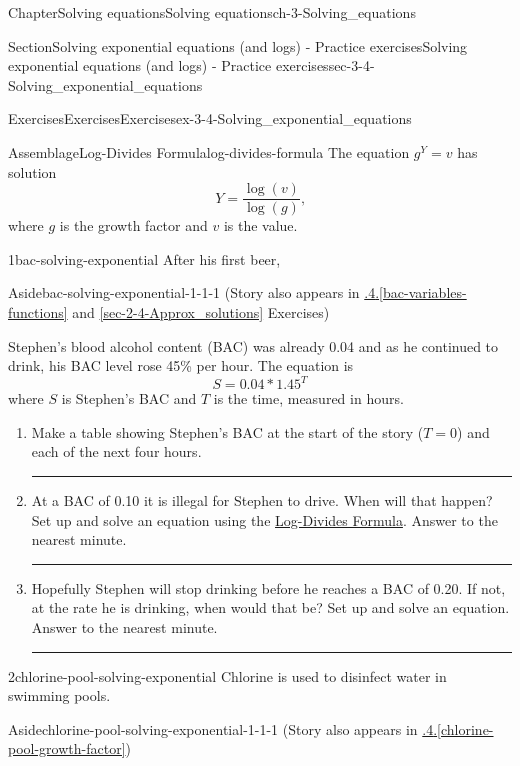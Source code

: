 \documentclass[twoside,11pt,]{book}
\newcommand{\xreffont}{\relax}
\newlength{\workspacestrutwidth}
\numberwithin{equation}{section}
\begin{document}
\begin{chapterptx}{Chapter}{Solving equations}{}{Solving equations}{}{}{ch-3-Solving_equations}
\begin{sectionptx}{Section}{Solving exponential equations (and logs) - Practice exercises}{}{Solving exponential equations (and logs) - Practice exercises}{}{}{sec-3-4-Solving_exponential_equations}
\begin{exercises-subsection-numberless}{Exercises}{Exercises}{}{Exercises}{}{}{ex-3-4-Solving_exponential_equations}
\begin{assemblage}{Assemblage}{Log-Divides Formula}{log-divides-formula}
The equation \(g^Y = v\) has solution%
\begin{equation*}
Y = \frac{\log (v)}{\log(g)}\text{,}
\end{equation*}
where \(g\) is the growth factor and \(v\) is the value.%
\end{assemblage}
\clearpage
\begin{divisionexercise}{1}{}{}{bac-solving-exponential}%
After his first beer, \begin{aside}{Aside}{}{bac-solving-exponential-1-1-1}%
(Story also appears in \hyperref[bac-variables-functions]{{\xreffont 1.1.4}.{\xreffont\ref{bac-variables-functions}}} and \hyperref[sec-2-4-Approx_solutions]{{\xreffont\ref{sec-2-4-Approx_solutions}}} Exercises)%
\end{aside}
 Stephen's blood alcohol content (BAC) was already 0.04 and as he continued to drink, his BAC level rose 45\% per hour. The equation is%
\begin{equation*}
S = 0.04 \ast 1.45^T
\end{equation*}
where \(S\) is Stephen's BAC and \(T\) is the time, measured in hours.%
\begin{enumerate}[label=(\alph*),ref=\alph*]%
\item{}Make a table showing Stephen's BAC at the start of the story (\(T=0\)) and each of the next four hours.%
\par\rule{\workspacestrutwidth}{1.5in}%
\item{}At a BAC of 0.10 it is illegal for Stephen to drive. When will that happen? Set up and solve an equation using the \hyperref[log-divides-formula]{Log-Divides Formula}. Answer to the nearest minute.%
\par\rule{\workspacestrutwidth}{1.5in}%
\item{}Hopefully Stephen will stop drinking before he reaches a BAC of 0.20. If not, at the rate he is drinking, when would that be? Set up and solve an equation. Answer to the nearest minute.%
\par\rule{\workspacestrutwidth}{1in}%
\end{enumerate}%
\end{divisionexercise}%
\clearpage
\begin{divisionexercise}{2}{}{}{chlorine-pool-solving-exponential}%
Chlorine is used to disinfect water in swimming pools. \begin{aside}{Aside}{}{chlorine-pool-solving-exponential-1-1-1}%
(Story also appears in \hyperref[chlorine-pool-growth-factor]{{\xreffont 5.3.4}.{\xreffont\ref{chlorine-pool-growth-factor}}})%

\end{aside}
\end{divisionexercise}
\end{exercises-subsection-numberless}
\end{sectionptx}
\end{chapterptx}
\end{document}
